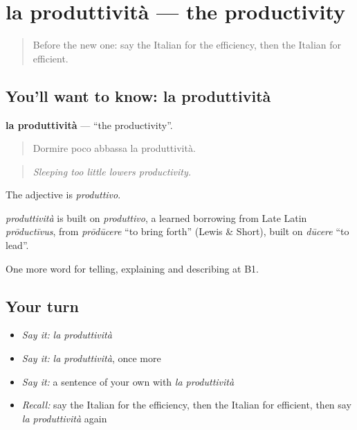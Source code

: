 \section[la produttività]{la produttività — the productivity}

\label{lesson:IT-C362-produttivita}



\begin{quote}
Before the new one: say the Italian for the efficiency, then the Italian for efficient.
\end{quote}

\subsection*{You'll want to know: la produttività}
\textbf{la produttività} — \textquotedblleft{}the productivity\textquotedblright{}.

\begin{quote}
Dormire poco abbassa la produttività.
\end{quote}

\begin{quote}
\emph{Sleeping too little lowers productivity.}
\end{quote}

The adjective is \emph{produttivo}.

\begin{cousinweb}
\emph{produttività} is built on \emph{produttivo}, a learned borrowing from Late Latin \emph{prōductīvus}, from \emph{prōdūcere} \textquotedblleft{}to bring forth\textquotedblright{} (Lewis \& Short), built on \emph{dūcere} \textquotedblleft{}to lead\textquotedblright{}.
\end{cousinweb}

\begin{grammarlens}[title={What you've built}]
One more word for telling, explaining and describing at B1.
\end{grammarlens}

\subsection*{Your turn}
\begin{itemize}
\raggedright
  \item \emph{Say it:} \emph{la produttività}
  \item \emph{Say it:} \emph{la produttività}, once more
  \item \emph{Say it:} a sentence of your own with \emph{la produttività}
  \item \emph{Recall:} say the Italian for the efficiency, then the Italian for efficient, then say \emph{la produttività} again
\end{itemize}

